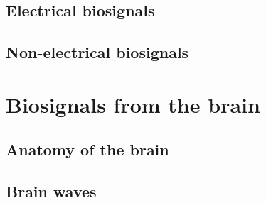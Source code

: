 \lipsum[1-2]


\subsection{Electrical biosignals}
\label{subsec:biomedical_signals_origin_electrical}



\lipsum[1-3]


\subsection{Non-electrical biosignals}
\label{subsec:biomedical_signals_origin_non_electrical}



\lipsum[1-2]



\section{Biosignals from the brain}
\label{sec:biomedical_signals_brain_signals}


\lipsum[1-2]



\subsection{Anatomy of the brain}
\label{subsec:biomedical_signals_brain_signals_anatomy}


\lipsum[1-2]


\subsection{Brain waves}
\label{subsec:biomedical_signals_brain_signals_brain_waves}

